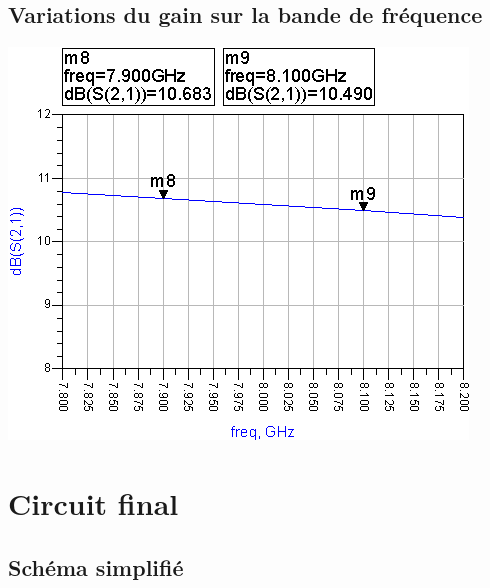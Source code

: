 \documentclass{article}
\begin{document}
\begin{centering}
\subsection{Variations du gain sur la bande de fréquence}

\includegraphics{variation.png}

\section{Circuit final}
\subsection{Schéma simplifié}


\end{centering}
\end{document}
